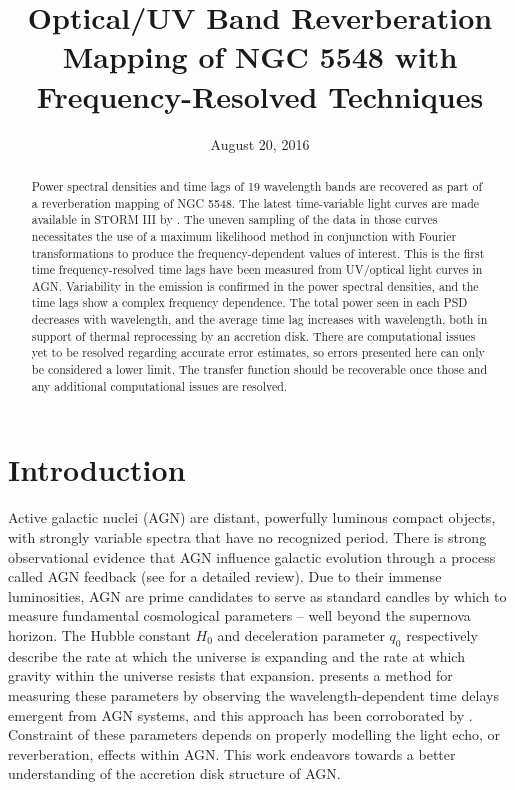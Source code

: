 \documentclass[11pt,letterpaper]{article}
\begin{document}
\title{Optical/UV Band
Reverberation Mapping of NGC 5548 with Frequency-Resolved Techniques}

\date{August 20, 2016}

\maketitle

\begin{abstract}

Power spectral densities and time lags of 19 wavelength bands are recovered as part of a reverberation mapping of NGC 5548. The latest time-variable light curves are made available in STORM III by \cite{2016ApJ...821...56F}. The uneven sampling of the data in those curves necessitates the use of a maximum likelihood method in conjunction with Fourier transformations to produce the frequency-dependent values of interest. This is the first time frequency-resolved time lags have been measured from UV/optical light curves in AGN. Variability in the emission is confirmed in the power spectral densities, and the time lags show a complex frequency dependence. The total power seen in each PSD decreases with wavelength, and the average time lag increases with wavelength, both in support of thermal reprocessing by an accretion disk. There are computational issues yet to be resolved regarding accurate error estimates, so errors presented here can only be considered a lower limit. The transfer function should be recoverable once those and any additional computational issues are resolved.

\end{abstract}


\section{Introduction}
\label{sec:intro}

Active galactic nuclei (AGN) are distant, powerfully luminous compact objects, with strongly variable spectra that have no recognized period. There is strong observational evidence that AGN influence galactic evolution through a process called AGN feedback (see \cite{2012ARA&A..50..455F} for a detailed review). Due to their immense luminosities, AGN are prime candidates to serve as standard candles by which to measure fundamental cosmological parameters -- well beyond the supernova horizon. The Hubble constant $H_0$ and deceleration parameter $q_0$ respectively describe the rate at which the universe is expanding and the rate at which gravity within the universe resists that expansion. \cite{1999MNRAS.302L..24C} presents a method for measuring these parameters by observing the wavelength-dependent time delays emergent from AGN systems, and this approach has been corroborated by \cite{2007MNRAS.380..669C}. Constraint of these parameters depends on properly modelling the light echo, or reverberation, effects within AGN. This work endeavors towards a better understanding of the accretion disk structure of AGN.
\end{document}
